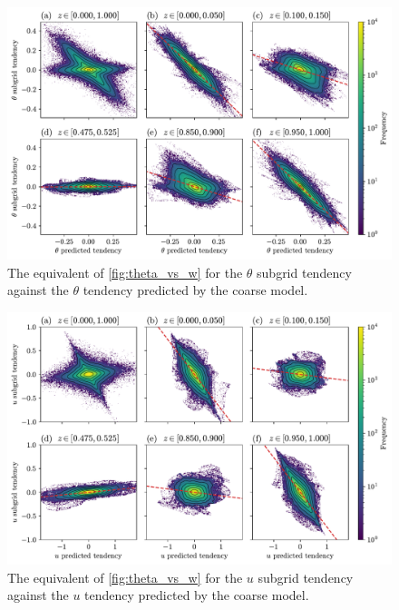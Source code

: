 \documentclass[../main.tex]{subfiles}
\begin{document}
\begin{figure}[ht]
    \centering
    \includegraphics[width=0.95\linewidth]{figures/theta_subgrid_vs_pred_tend.pdf}
    \caption{
        The equivalent of \cref{fig:theta_vs_w} for the $\theta$ subgrid
        tendency against the $\theta$ tendency predicted by the coarse model.
    }
    \label{fig:theta_subgrid_vs_pred_tend}
\end{figure}

\begin{figure}[ht]
    \centering
    \includegraphics[width=0.95\linewidth]{figures/u_subgrid_vs_pred_tend.pdf}
    \caption{
        The equivalent of \cref{fig:theta_vs_w} for the $u$ subgrid
        tendency against the $u$ tendency predicted by the coarse model.
    }
    \label{fig:u_subgrid_vs_pred_tend}
\end{figure}
\end{document}

